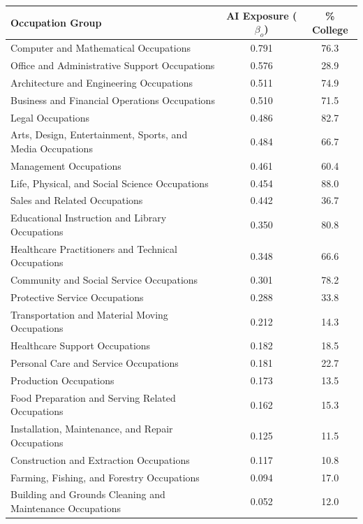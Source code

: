 \begin{small}
\begin{tabular}{lcc}
\hline
Occupation Group & AI Exposure ($\beta_o$) & \% College \\
\hline
Computer and Mathematical Occupations&0.791&76.3\\
Office and Administrative Support Occupations&0.576&28.9\\
Architecture and Engineering Occupations&0.511&74.9\\
Business and Financial Operations Occupations&0.510&71.5\\
Legal Occupations&0.486&82.7\\
Arts, Design, Entertainment, Sports, and Media Occupations&0.484&66.7\\
Management Occupations&0.461&60.4\\
Life, Physical, and Social Science Occupations&0.454&88.0\\
Sales and Related Occupations&0.442&36.7\\
Educational Instruction and Library Occupations&0.350&80.8\\
Healthcare Practitioners and Technical Occupations&0.348&66.6\\
Community and Social Service Occupations&0.301&78.2\\
Protective Service Occupations&0.288&33.8\\
Transportation and Material Moving Occupations&0.212&14.3\\
Healthcare Support Occupations&0.182&18.5\\
Personal Care and Service Occupations&0.181&22.7\\
Production Occupations&0.173&13.5\\
Food Preparation and Serving Related Occupations&0.162&15.3\\
Installation, Maintenance, and Repair Occupations&0.125&11.5\\
Construction and Extraction Occupations&0.117&10.8\\
Farming, Fishing, and Forestry Occupations&0.094&17.0\\
Building and Grounds Cleaning and Maintenance Occupations&0.052&12.0\\
\hline
\end{tabular}
\end{small}

